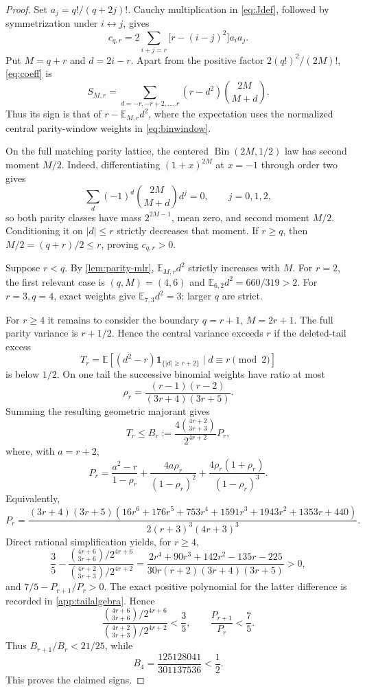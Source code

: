 \documentclass[11pt,a4paper]{article}
\newcommand{\E}{\mathbb E}
\begin{document}
\begin{proof}
Set $a_j=q!/(q+2j)!$.  Cauchy multiplication in \cref{eq:Jdef}, followed by
symmetrization under $i\leftrightarrow j$, gives
\begin{equation}\label{eq:coeff}
 c_{q,r}=2\sum_{i+j=r}\bigl[r-(i-j)^2\bigr]a_i a_j.
\end{equation}
Put $M=q+r$ and $d=2i-r$.  Apart from the positive factor
$2(q!)^2/(2M)!$, \cref{eq:coeff} is
\begin{equation}\label{eq:binwindow}
 S_{M,r}=\sum_{d=-r,-r+2,\ldots,r}
 (r-d^2)\binom{2M}{M+d}.
\end{equation}
Thus its sign is that of $r-\E_{M,r}d^2$, where the expectation uses the
normalized central parity-window weights in \cref{eq:binwindow}.

On the full matching parity lattice, the centered
$\operatorname{Bin}(2M,1/2)$ law has second moment $M/2$.  Indeed,
differentiating $(1+x)^{2M}$ at $x=-1$ through order two gives
\[
 \sum_d(-1)^d\binom{2M}{M+d}d^j=0,
 \qquad j=0,1,2,
\]
so both parity classes have mass $2^{2M-1}$, mean zero, and second moment
$M/2$.  Conditioning it on
$|d|\le r$ strictly decreases that moment.  If $r\ge q$, then
$M/2=(q+r)/2\le r$, proving $c_{q,r}>0$.

Suppose $r<q$.  By \cref{lem:parity-mlr}, $\E_{M,r}d^2$ strictly increases
with $M$.  For $r=2$, the first relevant
case is $(q,M)=(4,6)$ and $\E_{6,2}d^2=660/319>2$.  For $r=3,q=4$, exact
weights give $\E_{7,3}d^2=3$; larger $q$ are strict.

For $r\ge4$ it remains to consider the boundary $q=r+1$, $M=2r+1$.  The
full parity variance is $r+1/2$.  Hence the central variance exceeds $r$ if
the deleted-tail excess
\[
 T_r=\E[(d^2-r)\mathbf1_{\{|d|\ge r+2\}}\mid d\equiv r\pmod2]
\]
is below $1/2$.  On one tail the successive binomial weights have ratio at
most
\[
 \rho_r=\frac{(r-1)(r-2)}{(3r+4)(3r+5)}.
\]
Summing the resulting geometric majorant gives
\begin{equation}\label{eq:tailbound}
 T_r\le B_r:=\frac{4\binom{4r+2}{3r+3}}{2^{4r+2}}P_r,
\end{equation}
where, with $a=r+2$,
\[
P_r=\frac{a^2-r}{1-\rho_r}
+\frac{4a\rho_r}{(1-\rho_r)^2}
+\frac{4\rho_r(1+\rho_r)}{(1-\rho_r)^3}.
\]
Equivalently,
\[
 P_r=\frac{(3r+4)(3r+5)
 (16r^6+176r^5+753r^4+1591r^3+1943r^2+1353r+440)}
 {2(r+3)^3(4r+3)^3}.
\]
Direct rational simplification yields, for $r\ge4$,
\[
 \frac35-
 \frac{\binom{4r+6}{3r+6}/2^{4r+6}}
      {\binom{4r+2}{3r+3}/2^{4r+2}}
 =\frac{2r^4+90r^3+142r^2-135r-225}
 {30r(r+2)(3r+4)(3r+5)}>0,
\]
and $7/5-P_{r+1}/P_r>0$.  The exact positive polynomial for the latter
difference is recorded in \cref{app:tailalgebra}.
Hence
\[
 \frac{\binom{4r+6}{3r+6}/2^{4r+6}}
      {\binom{4r+2}{3r+3}/2^{4r+2}}<\frac35,
 \qquad \frac{P_{r+1}}{P_r}<\frac75.
\]
Thus $B_{r+1}/B_r<21/25$, while
\[
 B_4=\frac{125128041}{301137536}<\frac12.
\]
This proves the claimed signs.


\end{proof}
\end{document}
